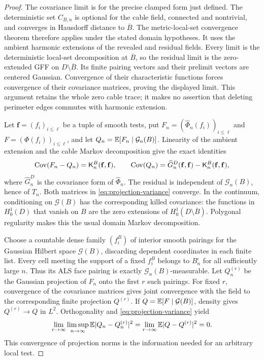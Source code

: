 \begin{proof}
The covariance limit is for the precise clamped form just defined.
The deterministic set \(C_{B,n}\) is optional for the cable field,
connected and nontrivial, and converges in Hausdorff distance to
\(\overline B\). The metric-local-set convergence theorem
\cite[Lemma~4.9]{ALS2018} therefore applies under the stated domain
hypotheses. It uses the ambient harmonic extensions of the revealed
and residual fields. Every limit is the deterministic local-set
decomposition at \(\overline B\), so the residual limit is the
zero-extended GFF on \(D\setminus\overline B\). Its finite pairing
vectors and their prelimit vectors are centered Gaussian. Convergence
of their characteristic functions forces convergence of their covariance
matrices, proving the displayed limit. This argument retains the whole
zero cable trace; it makes no assertion that deleting perimeter edges
commutes with harmonic extension.

Let \(\mathbf f=(f_i)_{i\le\ell}\) be a tuple of smooth tests, put
\(F_n=(\widehat\Phi_n(f_i))_{i\le\ell}\) and
\(F=(\Phi(f_i))_{i\le\ell}\), and let
\(Q_n=\mathbb E[F_n\mid\mathcal G_n(B)]\).
Linearity of the ambient extension and the cable Markov decomposition
give the exact identities
\begin{equation}
 \operatorname{Cov}(F_n-Q_n)=\mathsf K_n^B(\mathbf f,\mathbf f),\qquad
 \operatorname{Cov}(Q_n)=\widehat G_n^D(\mathbf f,\mathbf f)
                  -\mathsf K_n^B(\mathbf f,\mathbf f),
 \label{eq:projection-variance}
\end{equation}
where \(\widehat G_n^D\) is the covariance form of
\(\widehat\Phi_n\). The residual is independent of
\(\mathcal G_n(B)\), hence of \(T_n\). Both matrices in
\eqref{eq:projection-variance} converge. In the continuum, conditioning
on \(\mathcal G(B)\) has the corresponding killed covariance:
the functions in \(H^1_0(D)\) that vanish on \(B\) are the zero
extensions of \(H^1_0(D\setminus\overline B)\). Polygonal regularity
makes this the usual domain Markov decomposition.

Choose a countable dense family \((f_i^B)\) of interior smooth pairings
for the Gaussian Hilbert space \(\mathcal G(B)\), discarding dependent
coordinates in each finite list. Every cell meeting the support of a
fixed \(f_i^B\) belongs to \(B_n^\square\) for all sufficiently
large \(n\). Thus its ALS face pairing is exactly
\(\mathcal G_n(B)\)-measurable. Let \(Q_n^{(r)}\) be the Gaussian
projection of \(F_n\) onto the first \(r\) such pairings. For fixed \(r\),
convergence of the covariance matrices gives joint convergence with the
field to the corresponding finite projection \(Q^{(r)}\). If
\(Q=\mathbb E[F\mid\mathcal G(B)]\), density gives \(Q^{(r)}\to Q\) in
\(L^2\). Orthogonality and \eqref{eq:projection-variance} yield
\begin{equation}
 \lim_{r\to\infty}\limsup_{n\to\infty}
 \mathbb E|Q_n-Q_n^{(r)}|^2
 =\lim_{r\to\infty}\mathbb E|Q-Q^{(r)}|^2=0.
 \label{eq:projection-strong}
\end{equation}
This convergence of projection norms is the information needed for
an arbitrary local test.


\end{proof}
